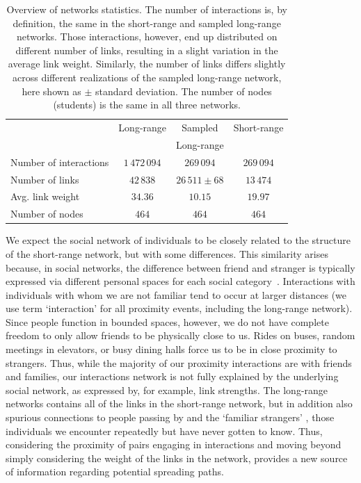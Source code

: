 \documentclass[fleqn,10pt]{wlscirep}
\begin{document}
\begin{table}
  \begin{center}
  \begin{footnotesize}
    \begin{tabular}{ | l | c | c | c |}
      \hline
       & Long-range & Sampled & Short-range\\
       & & Long-range & \\ \hline
      Number of interactions & $1\,472\,094$ & $269\,094$ & $269\,094$\\ \hline
      Number of links & $42\,838$ & $26\,511 \pm 68$ & $13\,474$\\ \hline
      \parbox[t]{3.5cm}{Avg. link weight} & $34.36$ & $10.15$ & $19.97$\\ \hline
      Number of nodes & $464$ & $464$ & $464$\\    
      \hline 
    \end{tabular}
  \end{footnotesize}
  \vspace{2mm}
  \caption{Overview of networks statistics. The number of interactions is, by definition, the same in the short-range and sampled long-range networks. Those interactions, however, end up distributed on different number of links, resulting in a slight variation in the average link weight. Similarly, the number of links differs slightly across different realizations of the sampled long-range network, here shown as $\pm$ standard deviation.  The number of nodes (students) is the same in all three networks.
  \label{tab:table_1}}     
  \end{center}
\end{table}

We expect the social network of individuals to be closely related to the structure of the short-range network, but with some differences.
This similarity arises because, in social networks, the difference between friend and stranger is typically expressed via different personal spaces for each social category~\cite{hall1969hidden}. 
Interactions with individuals with whom we are not familiar tend to occur at larger distances (we use term `interaction' for all proximity events, including the long-range network).
Since people function in bounded spaces, however, we do not have complete freedom to only allow friends to be physically close to us.
Rides on buses, random meetings in elevators, or busy dining halls force us to be in close proximity to strangers. 
Thus, while the majority of our proximity interactions are with friends and families, our interactions network is not fully explained by the underlying social network, as expressed by, for example, link strengths.
The long-range networks contains all of the links in the short-range network, but in addition also spurious connections to people passing by and the `familiar strangers' \cite{milgram1992individual, sun2013understanding}, those individuals we encounter repeatedly but have never gotten to know.
Thus, considering the proximity of pairs engaging in interactions and moving beyond simply considering the weight of the links in the network, provides a new source of information regarding potential spreading paths.
\end{document}

